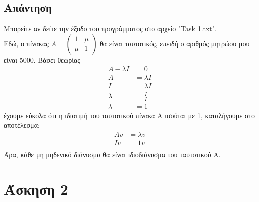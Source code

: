 \documentclass[a4paper,12pt]{article}
\begin{document}
\subsection{Απάντηση}
Μπορείτε αν δείτε την έξοδο του προγράμματος στο αρχείο "Task 1.txt".\\
Εδώ, ο πίνακας $
	A=\begin{pmatrix}
		1   & \mu \\
		\mu & 1
	\end{pmatrix}
$ θα είναι ταυτοτικός, επειδή ο αριθμός μητρώου μου είναι 5000. Βάσει θεωρίας
\begin{equation}
	\begin{split}
		A - \lambda I &= 0 \\
		A &= \lambda I \\
		I &= \lambda I \\
		\lambda & =\frac{I}{I} \\
		\lambda & =1
	\end{split}
\end{equation}
έχουμε εύκολα ότι η ιδιοτιμή του ταυτοτικού  πίνακα Α ισούται με 1,
καταλήγουμε στο αποτέλεσμα:
\begin{equation}
	\begin{split}
		A v &= \lambda v \\
		I v&= 1 v \\
	\end{split}
\end{equation}
Άρα, κάθε μη μηδενικό διάνυσμα θα είναι ιδιοδιάνυσμα του ταυτοτικού Α.
\newpage\section{Άσκηση 2}
\end{document}
